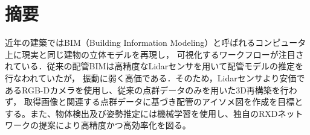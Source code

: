 \section*{%
摘要}

近年の建築ではBIM（Building Information Modeling）と呼ばれるコンピュータ上に現実と同じ建物の立体モデルを再現し，
可視化するワークフローが注目されている．従来の配管BIMは高精度なLidarセンサを用いて配管モデルの推定を行なわれていたが，
振動に弱く高価である．そのため，Lidarセンサより安価であるRGB-Dカメラを使用し、従来の点群データのみを用いた3D再構築を行わず，
取得画像と関連する点群データに基づき配管のアイソメ図を作成を目標とする。また、物体検出及び姿勢推定には機械学習を使用し、独自のRXDネットワークの提案により高精度かつ高効率化を図る。

